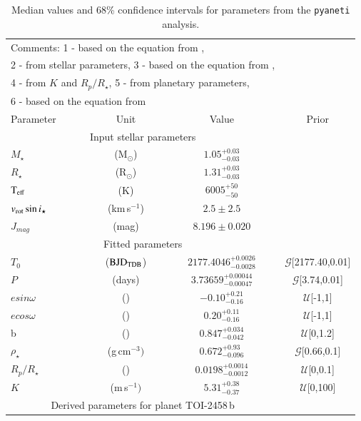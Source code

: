 \documentclass[traditabstract,longauth]{aa}
\providecommand{\bjdtdb}{\ensuremath{\rm {BJD_{TDB}}}}
\begin{document}
\begin{longtable}{lccc}
\caption{Median values and 68\% confidence intervals for parameters from the {\tt pyaneti} analysis.} \label{table:planet_par_pyan} \\
\endfirsthead
\multicolumn{3}{l}{Comments: 1 - based on the equation from \citet{Kempton18},}\\
\multicolumn{3}{l}{2 - from stellar parameters, 3 - based on the equation from \citet{Kempton18},}\\
\multicolumn{3}{l}{4 - from $K$ and $R_p/R_\star$, 5 - from planetary parameters,}\\
\multicolumn{3}{l}{6 - based on the equation from \citet{Fossati17}}\\
\endlastfoot
\hline
\hline
Parameter & Unit & Value & Prior\\
\hline
\multicolumn{3}{c}{Input stellar parameters} \\
\hline
$M_\star$ & (M$_{\odot}$) &  $ 1.05 _{- 0.03}^{ + 0.03} $ \\
$R_\star$ & (R$_{\odot}$) & $1.31 _{ - 0.03}^{ + 0.03} $  \\
$\rm T_{eff}$ & ($\mathrm{K}$) & $ 6005 _{- 50}^{ + 50} $ \\
$v_{\rm rot} \sin{i_\star} $ & (km\,s$^{-1}$) & $ 2.5 \pm 2.5 $ \\
$J_{mag}$ & (mag) & $ 8.196 \pm 0.020 $ \\
\hline
\multicolumn{3}{c}{Fitted parameters} \\
\hline
$T_0$ & (\bjdtdb) & $ 2177.4046_{-0.0028}^{+0.0026} $ & $\mathcal{G}$[2177.40,0.01] \\ 
$P$ & (days) &  $ 3.73659_{-0.00047}^{+0.00044} $ & $\mathcal{G}$[3.74,0.01] \\
{$esin\omega$} & () & $ -0.10_{-0.16}^{+0.21} $ & $\mathcal{U}$[-1,1] \\
{$ecos\omega$} & () & $ 0.20_{-0.16}^{+0.11} $ & $\mathcal{U}$[-1,1] \\
b & () & $ 0.847_{-0.042}^{+0.034} $ & $\mathcal{U}$[0,1.2] \\
$\rho_\star$ & (g\,cm$^{-3})$ & $ 0.672_{-0.096}^{+0.93} $ & $\mathcal{G}$[0.66,0.1] \\ 
$R_p/R_\star$ & () & $ 0.0198_{-0.0012}^{+0.0014} $ & $\mathcal{U}$[0,0.1] \\ 
$K$ & (m\,s$^{-1})$ & $ 5.31_{-0.37}^{+0.38} $ & $\mathcal{U}$[0,100] \\
\hline
\multicolumn{3}{c}{Derived parameters for planet TOI-2458\,b} \\
\hline

\end{longtable}
\end{document}
